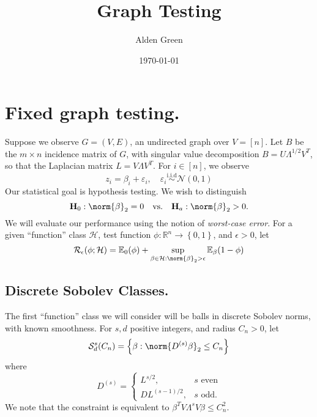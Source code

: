 \documentclass{article}
\newcommand{\Reals}{\mathbb{R}}
\newcommand{\set}[1]{\left\{#1\right\}}
\newcommand{\1}{\mathbf{1}}
\newcommand{\Ebb}{\mathbb{E}}
\theoremstyle{alden}
\theoremstyle{aldenthm}
\theoremstyle{definition}
\theoremstyle{remark}
\begin{document}
\title{Graph Testing}
\author{Alden Green}
\date{\today}
\maketitle

\section{Fixed graph testing.}

Suppose we observe $G = (V,E)$, an undirected graph over $V = [n]$. Let $B$ be the $m \times n$ incidence matrix of $G$, with singular value decomposition $B = U\Lambda^{1/2}V^T$, so that the Laplacian matrix $L = V \Lambda V^T$. For $i \in [n]$, we observe
\begin{equation*}
z_i = \beta_i + \varepsilon_i, \quad \varepsilon_i \overset{\textrm{i.i.d}}{\sim} \mathcal{N}(0,1)
\end{equation*}
Our statistical goal is hypothesis testing. We wish to distinguish
\begin{equation*}
\mathbf{H}_0: \norm{\beta}_2 = 0 \quad \textrm{vs.} \quad \mathbf{H}_a: \norm{\beta}_2 > 0.
\end{equation*}
We will evaluate our performance using the notion of \emph{worst-case error}. For a given ``function'' class $\mathcal{H}$, test function $\phi: \Reals^n \to \set{0,1}$, and $\epsilon > 0$, let
\begin{equation*}
\mathcal{R}_{\epsilon}(\phi;\mathcal{H})= \Ebb_{0}(\phi) + \sup_{\beta \in \mathcal{H}:\norm{\beta}_2 > \epsilon} \Ebb_{\beta}(1 - \phi)
\end{equation*}

\subsection{Discrete Sobolev Classes.}

The first ``function'' class we will consider will be balls in discrete Sobolev norms, with known smoothness. For $s,d$ positive integers, and radius $C_n > 0$, let
\begin{equation*}
\mathcal{S}^{s}_{d}(C_n) = \set{\beta: \norm{D^{(s)}\beta}_2 \leq C_n}
\end{equation*}
where
\begin{equation*}
D^{(s)} = 
\begin{cases}
L^{s/2}, & \text{$s$ even} \\
DL^{(s-1)/2}, & \text{$s$ odd}.
\end{cases}
\end{equation*}
We note that the constraint is equivalent to $\beta^T V \Lambda^s V \beta \leq C_n^2$.
\end{document}
